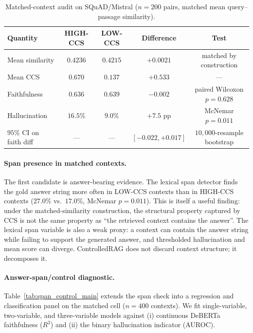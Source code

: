 \begin{table}[!htb]
\centering
\caption{Matched-context audit on SQuAD/Mistral ($n{=}200$ pairs,
matched mean query--passage similarity).}
\label{tab:matched_ccs_main}
\footnotesize
\begin{tabular}{lcccc}
\toprule
Quantity & HIGH-CCS & LOW-CCS & Difference & Test \\
\midrule
Mean similarity & $0.4236$ & $0.4215$ & $+0.0021$ & matched by construction \\
Mean CCS        & $0.670$  & $0.137$  & $+0.533$  & --- \\
Faithfulness    & $0.636$  & $0.639$  & $-0.002$  & paired Wilcoxon $p=0.628$ \\
Hallucination   & $16.5\%$ & $9.0\%$  & $+7.5$ pp & McNemar $p=0.011$ \\
$95\%$ CI on faith diff & --- & --- & $[-0.022, +0.017]$ & $10{,}000$-resample bootstrap \\
\bottomrule
\end{tabular}
\end{table}

\paragraph{Span presence in matched contexts.} The first candidate is
answer-bearing evidence.
The lexical span detector finds the gold answer string more often in
LOW-CCS contexts than in HIGH-CCS contexts ($27.0\%$ vs.\ $17.0\%$,
McNemar $p=0.011$). This is itself a useful finding: under the
matched-similarity construction, the structural property captured by
CCS is not the same property as ``the retrieved context contains the
answer''. The lexical span variable is also a weak proxy: a context can
contain the answer string while failing to support the generated answer,
and thresholded hallucination and mean score can diverge. ControlledRAG
does not discard context structure; it decomposes it.

\paragraph{Answer-span/control diagnostic.}
Table~\ref{tab:span_control_main} extends the span check into a
regression and classification panel on the matched cell ($n=400$
contexts). We fit single-variable, two-variable, and three-variable
models against (i) continuous DeBERTa faithfulness ($R^2$) and (ii) the
binary hallucination indicator (AUROC).

